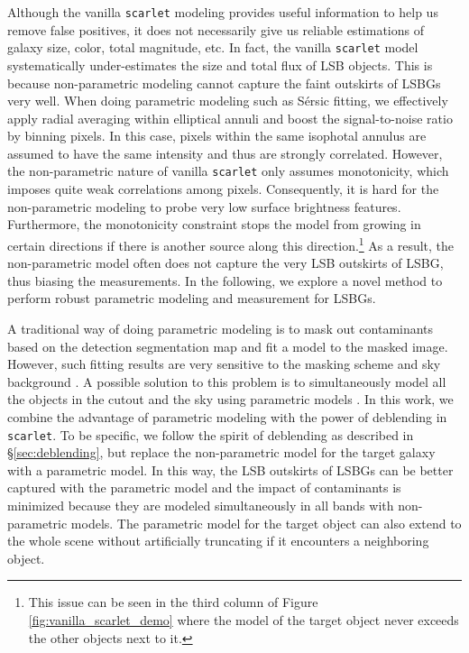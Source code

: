\documentclass[twocolumn,astrosymb,twocolappendix,linenumbers]{aastex631}
\newcommand{\code}[1]{\texttt{#1}}
\newcommand{\sersic}{S\'ersic}
\begin{document}
\begin{CJK*}{UTF8}{gbsn}
Although the vanilla \code{scarlet} modeling provides useful information to help us remove false positives, it does not necessarily give us reliable estimations of galaxy size, color, total magnitude, etc. In fact, the vanilla \code{scarlet} model systematically under-estimates the size and total flux of LSB objects. 
This is because non-parametric modeling cannot capture the faint outskirts of LSBGs very well. When doing parametric modeling such as \sersic{} fitting, we effectively apply radial averaging within elliptical annuli and boost the signal-to-noise ratio by binning pixels. In this case, pixels within the same isophotal annulus are assumed to have the same intensity and thus are strongly correlated. However, the non-parametric nature of vanilla \code{scarlet} only assumes monotonicity, which imposes quite weak correlations among pixels. Consequently, it is hard for the non-parametric modeling to probe very low surface brightness features. Furthermore, the monotonicity constraint stops the model from growing in certain directions if there is another source along this direction.\footnote{This issue can be seen in the third column of Figure \ref{fig:vanilla_scarlet_demo} where the model of the target object never exceeds the other objects next to it.} As a result, the non-parametric model often does not capture the very LSB outskirts of LSBG, thus biasing the measurements. In the following, we explore a novel method to perform robust parametric modeling and measurement for LSBGs.

A traditional way of doing parametric modeling is to mask out contaminants based on the detection segmentation map and fit a model to the masked image. However, such fitting results are very sensitive to the masking scheme and sky background \citep[e.g.,][]{Greco2018}. A possible solution to this problem is to simultaneously model all the objects in the cutout and the sky using parametric models \citep[e.g.,][]{Lang2016,Dey2019,Liu2022}. In this work, we combine the advantage of parametric modeling with the power of deblending in \code{scarlet}. To be specific, we follow the spirit of deblending as described in \S\ref{sec:deblending}, but replace the non-parametric model for the target galaxy with a parametric model. In this way, the LSB outskirts of LSBGs can be better captured with the parametric model and the impact of contaminants is minimized because they are modeled simultaneously in all bands with non-parametric models. The parametric model for the target object can also extend to the whole scene without artificially truncating if it encounters a neighboring object. 


\end{CJK*}
\end{document}
